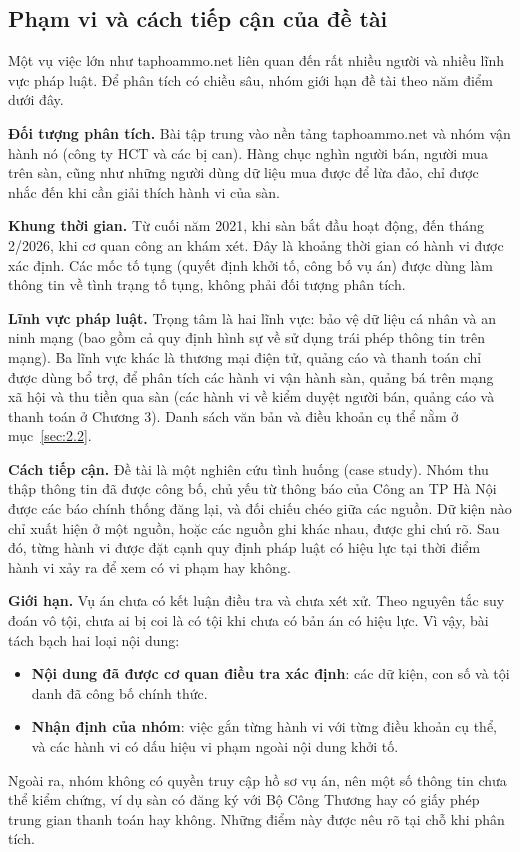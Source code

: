 \subsection{Phạm vi và cách tiếp cận của đề tài}\label{sec:1.2}

Một vụ việc lớn như taphoammo.net liên quan đến rất nhiều người và nhiều lĩnh vực pháp luật. Để phân tích có chiều sâu, nhóm giới hạn đề tài theo năm điểm dưới đây.

\textbf{Đối tượng phân tích.} Bài tập trung vào nền tảng taphoammo.net và nhóm vận hành nó (công ty HCT và các bị can). Hàng chục nghìn người bán, người mua trên sàn, cũng như những người dùng dữ liệu mua được để lừa đảo, chỉ được nhắc đến khi cần giải thích hành vi của sàn.

\textbf{Khung thời gian.} Từ cuối năm 2021, khi sàn bắt đầu hoạt động, đến tháng 2/2026, khi cơ quan công an khám xét. Đây là khoảng thời gian có hành vi được xác định. Các mốc tố tụng (quyết định khởi tố, công bố vụ án) được dùng làm thông tin về tình trạng tố tụng, không phải đối tượng phân tích.

\textbf{Lĩnh vực pháp luật.} Trọng tâm là hai lĩnh vực: bảo vệ dữ liệu cá nhân và an ninh mạng (bao gồm cả quy định hình sự về sử dụng trái phép thông tin trên mạng). Ba lĩnh vực khác là thương mại điện tử, quảng cáo và thanh toán chỉ được dùng bổ trợ, để phân tích các hành vi vận hành sàn, quảng bá trên mạng xã hội và thu tiền qua sàn (các hành vi về kiểm duyệt người bán, quảng cáo và thanh toán ở Chương 3). Danh sách văn bản và điều khoản cụ thể nằm ở mục~\ref{sec:2.2}.

\textbf{Cách tiếp cận.} Đề tài là một nghiên cứu tình huống (case study). Nhóm thu thập thông tin đã được công bố, chủ yếu từ thông báo của Công an TP Hà Nội được các báo chính thống đăng lại, và đối chiếu chéo giữa các nguồn. Dữ kiện nào chỉ xuất hiện ở một nguồn, hoặc các nguồn ghi khác nhau, được ghi chú rõ. Sau đó, từng hành vi được đặt cạnh quy định pháp luật có hiệu lực tại thời điểm hành vi xảy ra để xem có vi phạm hay không.

\textbf{Giới hạn.} Vụ án chưa có kết luận điều tra và chưa xét xử. Theo nguyên tắc suy đoán vô tội, chưa ai bị coi là có tội khi chưa có bản án có hiệu lực. Vì vậy, bài tách bạch hai loại nội dung:

\begin{itemize}
\item \textbf{Nội dung đã được cơ quan điều tra xác định}: các dữ kiện, con số và tội danh đã công bố chính thức.
\item \textbf{Nhận định của nhóm}: việc gắn từng hành vi với từng điều khoản cụ thể, và các hành vi có dấu hiệu vi phạm ngoài nội dung khởi tố.
\end{itemize}
Ngoài ra, nhóm không có quyền truy cập hồ sơ vụ án, nên một số thông tin chưa thể kiểm chứng, ví dụ sàn có đăng ký với Bộ Công Thương hay có giấy phép trung gian thanh toán hay không. Những điểm này được nêu rõ tại chỗ khi phân tích.


